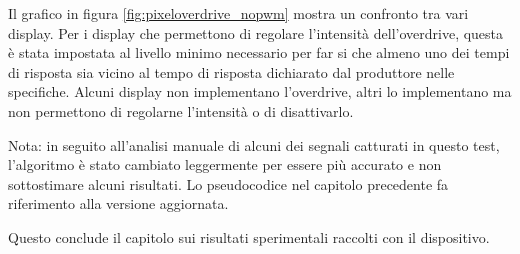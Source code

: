 Il grafico in figura \ref{fig:pixeloverdrive_nopwm} mostra un confronto tra vari display. Per i display che permettono di regolare l'intensità dell'overdrive, questa è stata impostata al livello minimo necessario per far si che almeno uno dei tempi di risposta sia vicino al tempo di risposta dichiarato dal produttore nelle specifiche. Alcuni display non implementano l'overdrive, altri lo implementano ma non permettono di regolarne l'intensità o di disattivarlo.

Nota: in seguito all'analisi manuale di alcuni dei segnali catturati in questo test, l'algoritmo è stato cambiato leggermente per essere più accurato e non sottostimare alcuni risultati. Lo pseudocodice nel capitolo precedente fa riferimento alla versione aggiornata.

Questo conclude il capitolo sui risultati sperimentali raccolti con il dispositivo.
